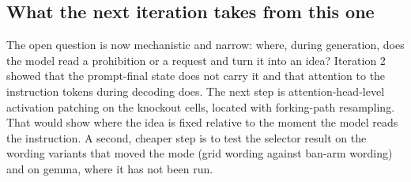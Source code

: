 \documentclass[11pt,letterpaper]{article}
\begin{document}
\subsection{What the next iteration takes from this one}
The open question is now mechanistic and narrow: where, during generation, does the model read a prohibition or a request and turn it into an idea? Iteration 2 showed that the prompt-final state does not carry it and that attention to the instruction tokens during decoding does. The next step is attention-head-level activation patching on the knockout cells, located with forking-path resampling. That would show where the idea is fixed relative to the moment the model reads the instruction. A second, cheaper step is to test the selector result on the wording variants that moved the mode (grid wording against ban-arm wording) and on gemma, where it has not been run.
\end{document}
